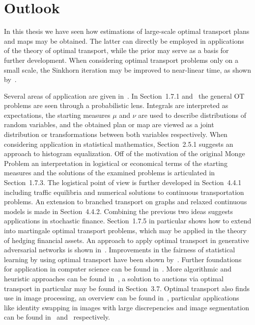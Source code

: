 \chapter*{Outlook}

In this thesis we have seen how estimations of large-scale optimal transport plans and maps may be obtained. The latter can directly be employed in applications of the theory of optimal transport, while the prior may serve as a basis for further development. When considering optimal transport problems only on a small scale, the Sinkhorn iteration may be improved to near-linear time, as shown by~\cite{Alts2019}.

Several areas of application are given in~\cite{San2015}. In Section~1.7.1 and\ \cite{Seg2018} the general OT problems are seen through a probabilistic lens. Integrals are interpreted as expectations, the starting measures $\mu$ and $\nu$ are used to describe distributions of random variables, and the obtained plan or map are viewed as a joint distribution or transformations between both variables respectively. When considering application in statistical mathematics, Section~2.5.1 suggests an approach to histogram equalization. Off of the motivation of the original Monge Problem  an interpretation in logistical or economical terms of the starting measures and the solutions of the examined problems is articulated in Section~1.7.3. The logistical point of view is further developed in Section~4.4.1 including traffic equilibria and numerical solutions to continuous transportation problems. An extension to branched transport on graphs and relaxed continuous models is made in Section~4.4.2. Combining the previous two ideas suggests applications in stochastic finance. Section~1.7.5 in particular shows how to extend into martingale optimal transport problems, which may be applied in the theory of hedging financial assets. An approach to apply optimal transport in generative adversarial networks is shown in~\cite{Sal2018}. Improvements in the fairness of statistical learning by using optimal transport have been shown by~\cite{Barr2018}. Further foundations for application in computer science can be found in~\cite{Levy2017}. More algorithmic and heuristic approaches can be found in~\cite{Pey2019}, a solution to auctions via optimal transport in particular may be found in Section~3.7. Optimal transport also finds use in image processing, an overview can be found in~\cite{Papa2015}, particular applications like identity swapping in images with large discrepencies and image segmentation can be found in~\cite{Zhu2020} and~\cite{Rabin2015} respectively.


